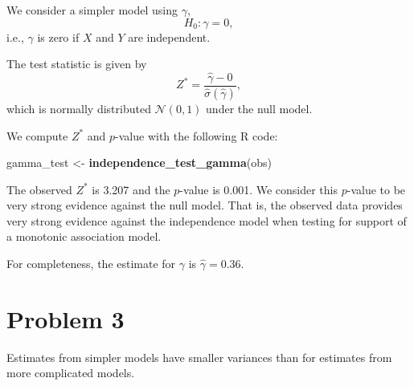 \documentclass[
]{article}
\newenvironment{Shaded}{\begin{snugshade}}{\end{snugshade}}
\newcommand{\FunctionTok}[1]{\textcolor[rgb]{0.13,0.29,0.53}{\textbf{#1}}}
\newcommand{\NormalTok}[1]{#1}
\newcommand{\OtherTok}[1]{\textcolor[rgb]{0.56,0.35,0.01}{#1}}
\begin{document}
We consider a simpler model using \(\gamma\), \[
  H_0 : \gamma = 0,
\] i.e., \(\gamma\) is zero if \(X\) and \(Y\) are independent.

The test statistic is given by \[
  Z^* = \frac{\hat\gamma-0}{\hat\sigma(\hat\gamma)},
\] which is normally distributed \(\mathcal{N}(0,1)\) under the null
model.

We compute \(Z^*\) and \(p\)-value with the following R code:

\begin{Shaded}
\begin{Highlighting}[]
\NormalTok{gamma\_test }\OtherTok{\textless{}{-}} \FunctionTok{independence\_test\_gamma}\NormalTok{(obs)}
\end{Highlighting}
\end{Shaded}

The observed \(Z^*\) is 3.207 and the \(p\)-value is 0.001. We consider
this \(p\)-value to be very strong evidence against the null model. That
is, the observed data provides very strong evidence against the
independence model when testing for support of a monotonic association
model.

For completeness, the estimate for \(\gamma\) is \(\hat\gamma=0.36\).

\hypertarget{problem-3}{%
\section{Problem 3}\label{problem-3}}


Estimates from simpler models have smaller variances than for estimates
from more complicated models.
\end{document}
